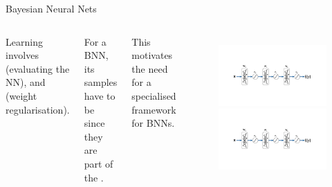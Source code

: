 \documentclass[lualatex, aspectratio=169]{beamer}
\begin{document}
\begin{frame}{Bayesian Neural Nets}

  \begin{columns}
    \column{0.35\pagewidth}
    Learning involves  (evaluating the NN), and  (weight regularisation). 

    \hspace{1cm}

    For a BNN, its samples have to be  since they are part of the .

    \hspace{1cm}

    This motivates the need for a specialised framework for BNNs.

    \column{0.6\pagewidth}
    \begin{figure}
      \includegraphics[page=2, trim={3cm 2.5cm 0cm 4.5cm}, clip, width=0.6\pagewidth]{assets/pictures.pdf}
      \includegraphics[page=4, trim={3cm 2.5cm 0cm 4.5cm}, clip, width=0.6\pagewidth]{assets/pictures.pdf}
    \end{figure}
  \end{columns}

\end{frame}
\end{document}
